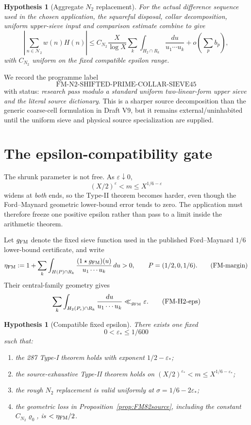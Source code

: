 \documentclass[11pt]{article}
\newtheorem{hypothesis}[theorem]{Hypothesis}
\theoremstyle{definition}
\theoremstyle{remark}
\newcommand{\1}{\mathbf 1}
\begin{document}
\begin{hypothesis}[Aggregate $N_2$ replacement]\label{hyp:N2agg}
For the actual difference sequence used in the chosen application, the squareful disposal, collar decomposition,
uniform upper-sieve input and comparison estimate combine to give
\[
 \boxed{
 \left|\sum_{n\in\mathcal N_2}w(n)H(n)\right|
 \le C_{N_2}\frac{X}{\log X}
 \sum_k\int_{H_2\cap R_k}\frac{du}{u_1\cdots u_k}
 +o\!\left(\sum_pb_p\right),}
\tag{N2-agg}
\]
with $C_{N_2}$ uniform on the fixed compatible epsilon range.
\end{hypothesis}

We record the programme label
\[
 \boxed{\mathrm{FM\!\mbox{-}N2\!\mbox{-}SHIFTED\!\mbox{-}PRIME\!\mbox{-}COLLAR\!\mbox{-}SIEVE45}}
\]
with status: \emph{research pass modulo a standard uniform two-linear-form upper sieve and the literal source
dictionary}.  This is a sharper source decomposition than the generic coarse-cell formulation in Draft V9, but
it remains external/uninhabited until the uniform sieve and physical source specialization are supplied.

\section{The epsilon-compatibility gate}
\label{sec:epsilon-compat}

The shrunk parameter is not free.  As $\varepsilon\downarrow0$,
\[
 (X/2)^\varepsilon<m\le X^{1/6-\varepsilon}
\]
widens at \emph{both} ends, so the Type-II theorem becomes harder, even though the Ford--Maynard geometric
lower-bound error tends to zero.  The application must therefore freeze one positive epsilon rather than pass
to a limit inside the arithmetic theorem.

Let $g_{\rm FM}$ denote the fixed sieve function used in the published Ford--Maynard $1/6$ lower-bound
certificate, and write
\[
 \eta_{\rm FM}:=
 1+\sum_k\int_{H(P)\cap R_k}
 \frac{(1\star g_{\rm FM})(u)}{u_1\cdots u_k}\,du>0,
 \qquad P=(1/2,0,1/6).
\tag{FM-margin}
\]
Their central-family geometry gives
\[
 \sum_k\int_{H_2(P_\varepsilon)\cap R_k}\frac{du}{u_1\cdots u_k}
 \ll_{g_{\rm FM}}\varepsilon.
\tag{FM-H2-eps}
\]

\begin{hypothesis}[Compatible fixed epsilon]\label{hyp:epsstar}
There exists one fixed
\[
 \boxed{0<\varepsilon_*\le1/600}
\]
such that:
\begin{enumerate}[label=(\roman*)]
\item the 287 Type-I theorem holds with exponent $1/2-\varepsilon_*$;
\item the source-exhaustive Type-II theorem holds on
$(X/2)^{\varepsilon_*}<m\le X^{1/6-\varepsilon_*}$;
\item the rough $N_2$ replacement is valid uniformly at $\sigma=1/6-2\varepsilon_*$;
\item the geometric loss in Proposition~\ref{prop:FM82source}, including the constant $C_{N_2}\varrho_0$,
is $<\eta_{\rm FM}/2$.
\end{enumerate}
\end{hypothesis}
\end{document}
